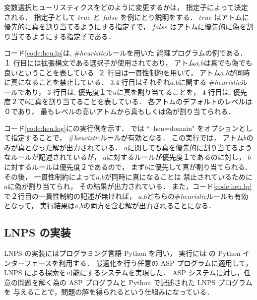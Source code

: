 変数選択ヒューリスティクスをどのように変更するかは，
指定子によって決定される．
指定子として $true$ と $false$ を例にとり説明をする．
$true$ はアトムに優先的に真を割り当てるようにする指定子で，
$false$ はアトムに優先的に偽を割り当てるようにする指定子である．

コード\ref{code:heu.lp}は, \#\textit{heuristic}ルールを用いた
論理プログラムの例である．
１ 行目には拡張構文である選択子が使用されており，
アトム$a$,$b$は真でも偽でも良いということを表している. 
２ 行目は一貫性制約を用いて，
アトム$a$,$b$が同時に真になることを禁止している．
3,4 行目はそれぞれ$a$,$b$に関する
\#\textit{heuristic}ルールであり，
3 行目は, 優先度１で$a$に真を割り当てることを，
4 行目は, 優先度２で$b$に真を割り当てることを表している．
各アトムのデフォルトのレベルは０であり，
最もレベルの高いアトムから真もしくは偽が割り当てられる．

コード\ref{code:heu.log}に{\clingo}の実行例を示す．
{\clingo}では ``--heu=domain" をオプションとして指定することで，
\#\textit{heuristic}ルールが有効となる．
この実行では，
アトム$b$のみが真となった解が出力されている．
$a$に関しても真を優先的に割り当てるようなルールが記述されているが，
$a$に対するルールが優先度１であるのに対し，
$b$に対するルールは優先度２であるので，
まず$b$に優先して真が割り当てられる．
その後，
一貫性制約によって$a$,$b$が同時に真になることは
禁止されているために
$a$に偽が割り当てられ，
その結果が出力されている．
また，コード\ref{code:heu.lp}で２行目の一貫性制約の記述が無ければ，
$a$,$b$どちらの\#\textit{heuristic}ルールも有効となって，
実行結果は$a$,$b$の両方を含む解が出力されることになる．




\subsection{LNPS の実装}
LNPS の実装にはプログラミング言語 Python を用い，
実行には {\clingo} の Python インターフェースを利用する．
最適化を行う任意の ASP プログラムに適用して，LNPS による探索を可能にするシステムを実現した．
ASP システムに対し，任意の問題を解く為の ASP プログラムと Python で記述された LNPS プログラムを
与えることで，問題の解を得られるという仕組みになっている．


